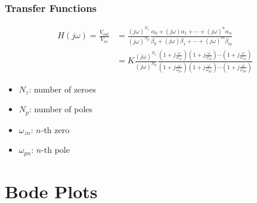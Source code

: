 \documentclass[aspectratio=169]{beamer}
\begin{document}
\begin{frame}
    \frametitle{Transfer Functions}
    
    \begin{align}
        H(j \omega) = \frac{V_{out}}{V_{in}} &= \frac{(j \omega)^{N_z}}{(j \omega)^{N_p}} \frac{\alpha_0 + (j \omega) \alpha_1 + \cdots + (j \omega)^n \alpha_n}{\beta_0 + (j \omega) \beta_1 + \cdots + (j \omega)^m \beta_m} \\
        &= K \frac{(j \omega)^{N_z}}{(j \omega)^{N_p}} \frac{\left(1 + j \frac{\omega}{\omega_{z1}}\right) \left(1 + j \frac{\omega}{\omega_{z2}}\right) \cdots \left(1 + j \frac{\omega}{\omega_{zn}}\right)}{\left(1 + j \frac{\omega}{\omega_{p1}}\right) \left(1 + j \frac{\omega}{\omega_{p2}}\right) \cdots \left(1 + j \frac{\omega}{\omega_{pn}}\right)}
    \end{align}
    \begin{itemize}
        \item \(N_z\): number of zeroes
        \item \(N_p\): number of poles
        \item \(\omega_{zn}\): \(n\)-th zero
        \item \(\omega_{pn}\): \(n\)-th pole
    \end{itemize}
\end{frame}

\section{Bode Plots}
\end{document}
